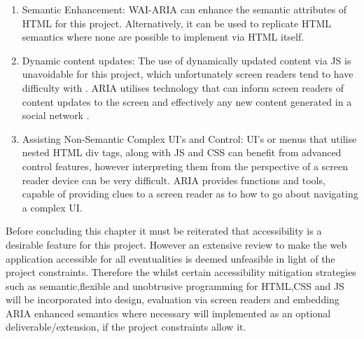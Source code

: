 \begin{enumerate}
    \item Semantic Enhancement: WAI-ARIA can enhance the semantic attributes of HTML for this project. Alternatively, it can be used to replicate HTML semantics where none are possible to implement via HTML itself.
    \item Dynamic content updates: The use of dynamically updated content via JS is unavoidable for this project, which unfortunately screen readers tend to have difficulty with \cite{Sukardi2016,Mills}. ARIA utilises technology that can inform screen readers of content updates to the screen and effectively any new content generated in a social  network \cite{Sukardi2016}.
    \item Assisting Non-Semantic Complex UI's and Control: UI's or menus that utilise nested HTML div tags, along with JS and CSS can benefit from advanced control features, however interpreting them from the perspective of a screen reader device can be very difficult. ARIA provides functions and tools, capable of providing clues to a screen reader as to how to go about navigating a complex UI.
\end{enumerate}

Before concluding this chapter it must be reiterated that accessibility is a desirable feature for this project. However an extensive  review to make the web application accessible for all eventualities is deemed unfeasible in light of the project constraints. Therefore the whilst certain accessibility mitigation strategies such as semantic,flexible and unobtrusive programming for HTML,CSS and JS will be incorporated into design, evaluation via screen readers and embedding ARIA enhanced semantics where necessary will  implemented as an optional deliverable/extension, if the project constraints allow it.



